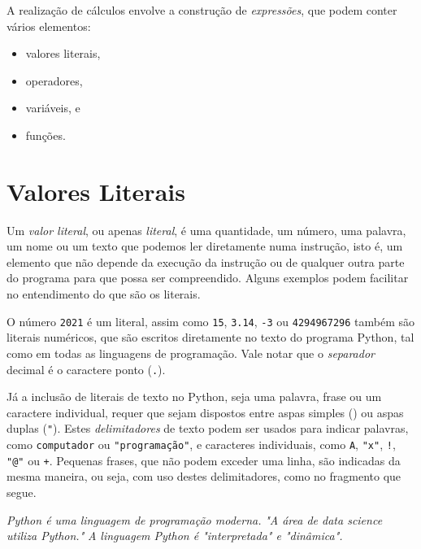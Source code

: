 \documentclass[
]{book}
\newenvironment{Shaded}{\begin{snugshade}}{\end{snugshade}}
\newcommand{\CommentTok}[1]{\textcolor[rgb]{0.56,0.35,0.01}{\textit{#1}}}
\providecommand{\tightlist}{%
  \setlength{\itemsep}{0pt}\setlength{\parskip}{0pt}}
\begin{document}
A realização de cálculos envolve a construção de \emph{expressões}, que podem conter vários elementos:

\begin{itemize}
\tightlist
\item
  valores literais,
\item
  operadores,
\item
  variáveis, e
\item
  funções.
\end{itemize}

\hypertarget{comput-liter}{%
\section{Valores Literais}\label{comput-liter}}

Um \emph{valor literal}, ou apenas \emph{literal}, é uma quantidade, um número, uma palavra, um nome ou um texto que podemos ler diretamente numa instrução, isto é, um elemento que não depende da execução da instrução ou de qualquer outra parte do programa para que possa ser compreendido. Alguns exemplos podem facilitar no entendimento do que são os literais.

O número \texttt{2021} é um literal, assim como \texttt{15}, \texttt{3.14}, \texttt{-3} ou \texttt{4294967296} também são literais numéricos, que são escritos diretamente no texto do programa Python, tal como em todas as linguagens de programação. Vale notar que o \emph{separador} decimal é o caractere ponto (\texttt{.}).

Já a inclusão de literais de texto no Python, seja uma palavra, frase ou um caractere individual, requer que sejam dispostos entre aspas simples (\texttt{\textquotesingle{}}) ou aspas duplas (\texttt{"}). Estes \emph{delimitadores} de texto podem ser usados para indicar palavras, como \texttt{\textquotesingle{}computador\textquotesingle{}} ou \texttt{"programação"}, e caracteres individuais, como \texttt{\textquotesingle{}A\textquotesingle{}}, \texttt{"x"}, \texttt{\textquotesingle{}!\textquotesingle{}}, \texttt{"@"} ou \texttt{\textquotesingle{}+\textquotesingle{}}. Pequenas frases, que não podem exceder uma linha, são indicadas da mesma maneira, ou seja, com uso destes delimitadores, como no fragmento que segue.

\begin{Shaded}
\begin{Highlighting}[]
\CommentTok{\textquotesingle{}Python é uma linguagem de programação moderna.\textquotesingle{}}
\CommentTok{"A área de \textquotesingle{}data science\textquotesingle{} utiliza Python."}
\CommentTok{\textquotesingle{}A linguagem Python é "interpretada" e "dinâmica".\textquotesingle{}}
\end{Highlighting}
\end{Shaded}
\end{document}
